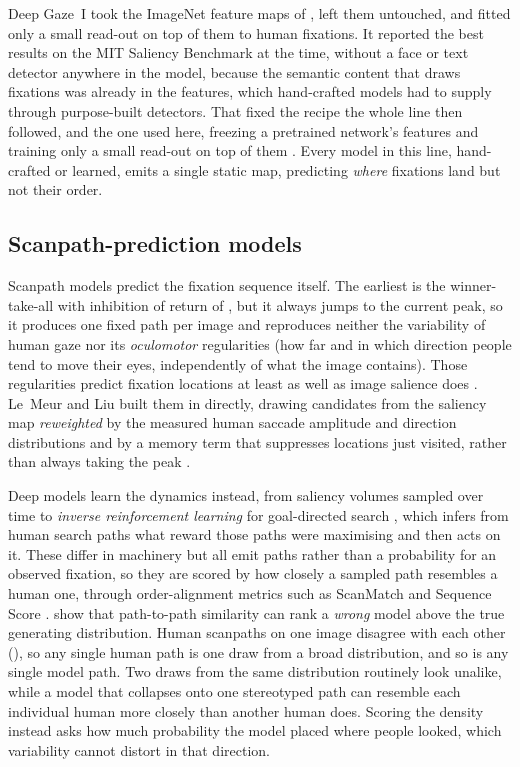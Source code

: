 Deep Gaze~I \citep{kummerer2015deepgaze1} took the ImageNet feature maps of
\citet{krizhevsky2012alexnet}, left them untouched, and fitted only a small read-out on top
of them to human fixations. It reported the best results on the MIT Saliency Benchmark at the
time, without a face or text detector anywhere in the model, because the semantic content that draws
fixations was already in the features, which hand-crafted models had to supply through
purpose-built detectors. That fixed the recipe
the whole line then followed, and the one used here, freezing a pretrained network's
features and training only a small read-out on top of them
\citep{kummerer2016deepgaze2, linardos2021deepgaze2e}. Every model in this line,
hand-crafted or learned, emits a single static map, predicting \emph{where} fixations
land but not their order.

\subsection{Scanpath-prediction models}
\label{subsec:scanpath-lineage}

Scanpath models predict the fixation sequence itself. The earliest is the winner-take-all
with inhibition of return of , but it always jumps to the
current peak, so it produces one fixed path per image and reproduces neither the
variability of human gaze nor its \emph{oculomotor} regularities (how far and in which
direction people tend to move their eyes, independently of what the image contains). Those
regularities predict fixation locations at least as well as image salience does
\citep{tatler2009prominence}. Le~Meur and Liu built them in directly, drawing candidates from the saliency map
\emph{reweighted} by the measured human saccade amplitude and direction distributions and by a memory
term that suppresses locations just visited, rather than always taking the peak
\citep{lemeur2015saccadic}.

Deep models learn the dynamics instead, from saliency volumes sampled over time
\citep{assens2017saltinet} to \emph{inverse reinforcement learning} for goal-directed search
\citep{yang2020predicting}, which infers from human search paths what reward those paths were
maximising and then acts on it. These differ in machinery but all emit paths rather than a probability
for an observed fixation, so they are scored by how closely a sampled path resembles a human
one, through order-alignment metrics such as ScanMatch \citep{cristino2010scanmatch} and Sequence Score
\citep{yang2020predicting}.
\citet{kummerer2021state} show that path-to-path similarity can rank a \emph{wrong} model above the
true generating distribution. Human scanpaths on one image disagree with each other
(), so any single human path
is one draw from a broad distribution, and so is any single model path. Two draws from
the same distribution routinely look unalike, while a model that collapses onto one
stereotyped path can resemble each individual
human more closely than another human does. Scoring the density instead asks how much probability the
model placed where people looked, which variability cannot distort in that direction.

